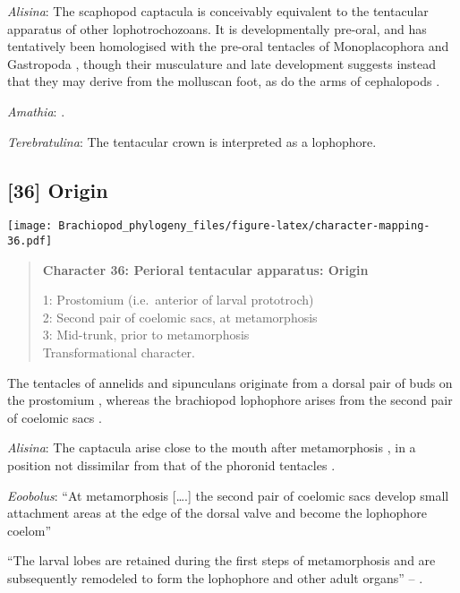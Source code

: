 \documentclass[openany]{book}
\theoremstyle{definition}
\theoremstyle{definition}
\theoremstyle{definition}
\theoremstyle{remark}
\begin{document}
\hypertarget{Alisina-coding-35}{}
\emph{Alisina}: The scaphopod captacula is conceivably equivalent to the
tentacular apparatus of other lophotrochozoans. It is developmentally
pre-oral, and has tentatively been homologised with the pre-oral
tentacles of Monoplacophora and Gastropoda \citep{Steiner1992}, though
their musculature and late development suggests instead that they may
derive from the molluscan foot, as do the arms of cephalopods
\citep{Wanninger2002M}.

\hypertarget{Amathia-coding-35}{}
\emph{Amathia}: \citet{Moysiuk2017Hyolithsare}.

\hypertarget{Terebratulina-coding-35}{}
\emph{Terebratulina}: The tentacular crown \citep{Zhang2013} is
interpreted as a lophophore.

\subsection*{{[}36{]} Origin}\label{origin}

\texttt{[image: Brachiopod\_phylogeny\_files/figure-latex/character-mapping-36.pdf]}

\begin{quote}
\textbf{Character 36: Perioral tentacular apparatus: Origin}

1: Prostomium (i.e.~anterior of larval prototroch)\\
2: Second pair of coelomic sacs, at metamorphosis\\
3: Mid-trunk, prior to metamorphosis\\
Transformational character.
\end{quote}

The tentacles of annelids and sipunculans originate from a dorsal pair
of buds on the prostomium \citep{Adrianov2006}, whereas the brachiopod
lophophore arises from the second pair of coelomic sacs
\citep{Nielsen1991}.

\hypertarget{Alisina-coding-36}{}
\emph{Alisina}: The captacula arise close to the mouth after
metamorphosis \citep{Wanninger2002M}, in a position not dissimilar from
that of the phoronid tentacles \citep{Santagata2004}.

\hypertarget{Eoobolus-coding-36}{}
\emph{Eoobolus}: ``At metamorphosis {[}\ldots{}.{]} the second pair of
coelomic sacs develop small attachment areas at the edge of the dorsal
valve and become the lophophore coelom'' \citep{Nielsen1991}

``The larval lobes are retained during the first steps of metamorphosis
and are\\
subsequently remodeled to form the lophophore and other adult organs''
-- \citet{Altenburger2013}.
\end{document}
